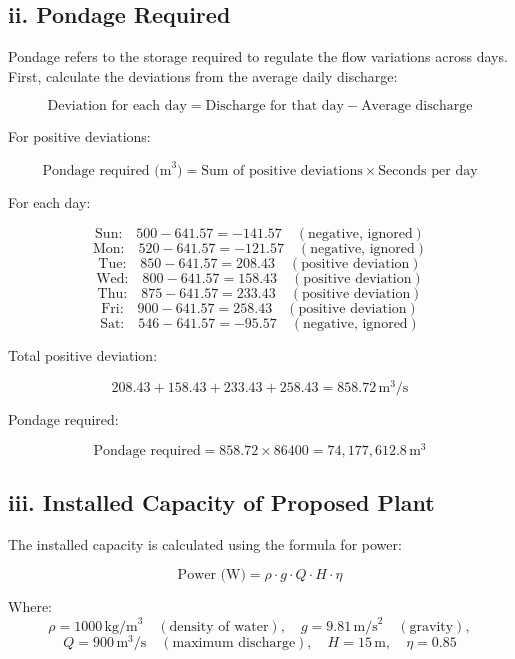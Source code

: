 \documentclass[12pt]{article}
\begin{document}
	\subsection*{ii. Pondage Required}
	
	Pondage refers to the storage required to regulate the flow variations across days. First, calculate the deviations from the average daily discharge:
	
	\[
	\text{Deviation for each day} = \text{Discharge for that day} - \text{Average discharge}
	\]
	
	For positive deviations:
	
	\[
	\text{Pondage required (m}^3\text{)} = \text{Sum of positive deviations} \times \text{Seconds per day}
	\]
	
	For each day:
	
	\[
	\text{Sun:} \quad 500 - 641.57 = -141.57 \quad (\text{negative, ignored})
	\]
	\[
	\text{Mon:} \quad 520 - 641.57 = -121.57 \quad (\text{negative, ignored})
	\]
	\[
	\text{Tue:} \quad 850 - 641.57 = 208.43 \quad (\text{positive deviation})
	\]
	\[
	\text{Wed:} \quad 800 - 641.57 = 158.43 \quad (\text{positive deviation})
	\]
	\[
	\text{Thu:} \quad 875 - 641.57 = 233.43 \quad (\text{positive deviation})
	\]
	\[
	\text{Fri:} \quad 900 - 641.57 = 258.43 \quad (\text{positive deviation})
	\]
	\[
	\text{Sat:} \quad 546 - 641.57 = -95.57 \quad (\text{negative, ignored})
	\]
	
	Total positive deviation:
	
	\[
	208.43 + 158.43 + 233.43 + 258.43 = 858.72 \, \text{m}^3/\text{s}
	\]
	
	Pondage required:
	
	\[
	\text{Pondage required} = 858.72 \times 86400 = 74,177,612.8 \, \text{m}^3
	\]
	
	\subsection*{iii. Installed Capacity of Proposed Plant}
	
	The installed capacity is calculated using the formula for power:
	
	\[
	\text{Power (W)} = \rho \cdot g \cdot Q \cdot H \cdot \eta
	\]
	
	Where:
	\[
	\rho = 1000 \, \text{kg/m}^3 \quad (\text{density of water}), \quad g = 9.81 \, \text{m/s}^2 \quad (\text{gravity}),
	\]
	\[
	Q = 900 \, \text{m}^3/\text{s} \quad (\text{maximum discharge}), \quad H = 15 \, \text{m}, \quad \eta = 0.85
	\]
	
\end{document}
